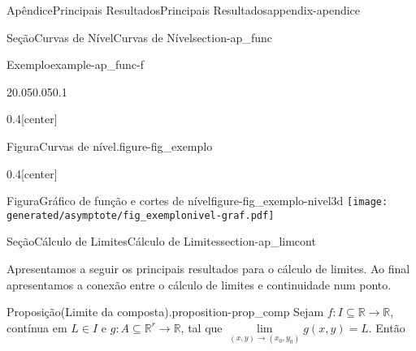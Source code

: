 \documentclass[oneside,10pt,]{book}
\numberwithin{equation}{section}
\newcommand{\R}{\mathbb R}
\begin{document}
\begin{appendixptx}{Apêndice}{Principais Resultados}{}{Principais Resultados}{}{}{appendix-apendice}
\begin{sectionptx}{Seção}{Curvas de Nível}{}{Curvas de Nível}{}{}{section-ap_func}
\begin{example}{Exemplo}{}{example-ap_func-f}
\begin{sidebyside}{2}{0.05}{0.05}{0.1}%
\begin{sbspanel}{0.4}[center]%
\begin{panelfigureptx}{Figura}{Curvas de nível.}{figure-fig_exemplo}{}%
%
\tcblower
\end{panelfigureptx}%
\end{sbspanel}%
\begin{sbspanel}{0.4}[center]%
\begin{panelfigureptx}{Figura}{Gráfico de função e cortes de nível}{figure-fig_exemplo-nivel3d}{}%
\texttt{[image: generated/asymptote/fig\_exemplonivel-graf.pdf]}
\tcblower
\end{panelfigureptx}%
\end{sbspanel}%
\end{sidebyside}%
%
\end{example}
\end{sectionptx}
%
%
\typeout{************************************************}
\typeout{************************************************}
%
\begin{sectionptx}{Seção}{Cálculo de Limites}{}{Cálculo de Limites}{}{}{section-ap_limcont}
\begin{introduction}{}%
Apresentamos a seguir os principais resultados para o cálculo de limites. Ao final apresentamos a conexão entre o cálculo de limites e continuidade num ponto.%
\end{introduction}%
\begin{proposition}{Proposição}{(Limite da composta).}{}{proposition-prop_comp}%
Sejam \(f\colon I\subseteq\R\to\R\), contínua em \(L\in
I\) e \(g\colon A\subseteq\R^r\to\R\), tal que \(\lim\limits_{(x,y)\to(x_0,y_0)} g(x,y)=L\). Então%

\end{proposition}
\end{sectionptx}
\end{appendixptx}
\end{document}
